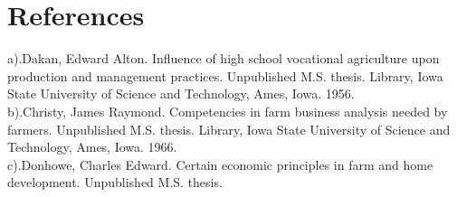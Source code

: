 \documentclass[10pt,letterpaper]{article}
\begin{document}
\section{References}
a).Dakan, Edward Alton. Influence of high school vocational agriculture upon production and management practices. Unpublished M.S. thesis. Library, Iowa State University of Science and Technology, Ames, Iowa. 1956.
\\b).Christy, James Raymond. Competencies in farm business analysis needed by farmers. Unpublished M.S. thesis. Library, Iowa State University of Science and Technology, Ames, Iowa. 1966. 
\\c).Donhowe, Charles Edward. Certain economic principles in farm and home development. Unpublished M.S. thesis. 
\end{document}
